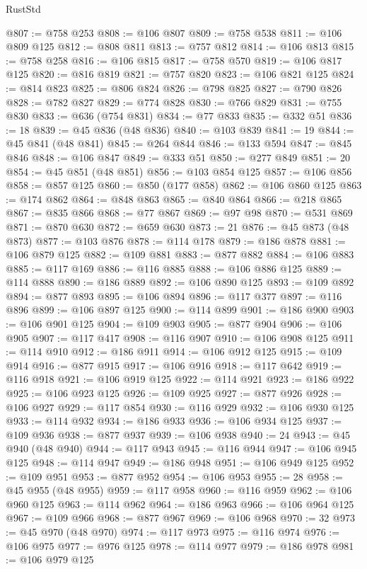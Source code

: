 \begin{lexlean}{RustStd}
\begin{coremodule}
@807 := @758 @253
@808 := @106 @807
@809 := @758 @538
@811 := @106 @809 @125
@812 := @808 @811
@813 := @757 @812
@814 := @106 @813
@815 := @758 @258
@816 := @106 @815
@817 := @758 @570
@819 := @106 @817 @125
@820 := @816 @819
@821 := @757 @820
@823 := @106 @821 @125
@824 := @814 @823
@825 := @806 @824
@826 := @798 @825
@827 := @790 @826
@828 := @782 @827
@829 := @774 @828
@830 := @766 @829
@831 := @755 @830
@833 := @636 (@754 @831)
@834 := @77 @833
@835 := @332 @51
@836 := 18
@839 := @45 @836 (@48 @836)
@840 := @103 @839
@841 := 19
@844 := @45 @841 (@48 @841)
@845 := @264 @844
@846 := @133 @594
@847 := @845 @846
@848 := @106 @847
@849 := @333 @51
@850 := @277 @849
@851 := 20
@854 := @45 @851 (@48 @851)
@856 := @103 @854 @125
@857 := @106 @856
@858 := @857 @125
@860 := @850 (@177 @858)
@862 := @106 @860 @125
@863 := @174 @862
@864 := @848 @863
@865 := @840 @864
@866 := @218 @865
@867 := @835 @866
@868 := @77 @867
@869 := @97 @98
@870 := @531 @869
@871 := @870 @630
@872 := @659 @630
@873 := 21
@876 := @45 @873 (@48 @873)
@877 := @103 @876
@878 := @114 @178
@879 := @186 @878
@881 := @106 @879 @125
@882 := @109 @881
@883 := @877 @882
@884 := @106 @883
@885 := @117 @169
@886 := @116 @885
@888 := @106 @886 @125
@889 := @114 @888
@890 := @186 @889
@892 := @106 @890 @125
@893 := @109 @892
@894 := @877 @893
@895 := @106 @894
@896 := @117 @377
@897 := @116 @896
@899 := @106 @897 @125
@900 := @114 @899
@901 := @186 @900
@903 := @106 @901 @125
@904 := @109 @903
@905 := @877 @904
@906 := @106 @905
@907 := @117 @417
@908 := @116 @907
@910 := @106 @908 @125
@911 := @114 @910
@912 := @186 @911
@914 := @106 @912 @125
@915 := @109 @914
@916 := @877 @915
@917 := @106 @916
@918 := @117 @642
@919 := @116 @918
@921 := @106 @919 @125
@922 := @114 @921
@923 := @186 @922
@925 := @106 @923 @125
@926 := @109 @925
@927 := @877 @926
@928 := @106 @927
@929 := @117 @854
@930 := @116 @929
@932 := @106 @930 @125
@933 := @114 @932
@934 := @186 @933
@936 := @106 @934 @125
@937 := @109 @936
@938 := @877 @937
@939 := @106 @938
@940 := 24
@943 := @45 @940 (@48 @940)
@944 := @117 @943
@945 := @116 @944
@947 := @106 @945 @125
@948 := @114 @947
@949 := @186 @948
@951 := @106 @949 @125
@952 := @109 @951
@953 := @877 @952
@954 := @106 @953
@955 := 28
@958 := @45 @955 (@48 @955)
@959 := @117 @958
@960 := @116 @959
@962 := @106 @960 @125
@963 := @114 @962
@964 := @186 @963
@966 := @106 @964 @125
@967 := @109 @966
@968 := @877 @967
@969 := @106 @968
@970 := 32
@973 := @45 @970 (@48 @970)
@974 := @117 @973
@975 := @116 @974
@976 := @106 @975
@977 := @976 @125
@978 := @114 @977
@979 := @186 @978
@981 := @106 @979 @125

\end{coremodule}
\end{lexlean}
